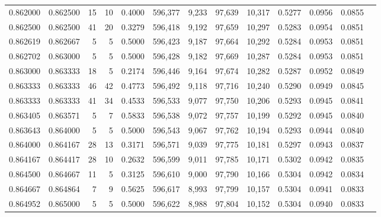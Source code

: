\begin{tabular}{rrrrrrrrrrrrr}
0.862000 & 0.862500 &    15 &  10 &                                     0.4000 & 596,377 &   9,233 &  97,639 &  10,317 & 0.5277 & 0.0956 & 0.0855 \\
0.862500 & 0.862500 &    41 &  20 &                                     0.3279 & 596,418 &   9,192 &  97,659 &  10,297 & 0.5283 & 0.0954 & 0.0851 \\
0.862619 & 0.862667 &     5 &   5 &                                     0.5000 & 596,423 &   9,187 &  97,664 &  10,292 & 0.5284 & 0.0953 & 0.0851 \\
0.862702 & 0.863000 &     5 &   5 &                                     0.5000 & 596,428 &   9,182 &  97,669 &  10,287 & 0.5284 & 0.0953 & 0.0851 \\
0.863000 & 0.863333 &    18 &   5 &                                     0.2174 & 596,446 &   9,164 &  97,674 &  10,282 & 0.5287 & 0.0952 & 0.0849 \\
0.863333 & 0.863333 &    46 &  42 &                                     0.4773 & 596,492 &   9,118 &  97,716 &  10,240 & 0.5290 & 0.0949 & 0.0845 \\
0.863333 & 0.863333 &    41 &  34 &                                     0.4533 & 596,533 &   9,077 &  97,750 &  10,206 & 0.5293 & 0.0945 & 0.0841 \\
0.863405 & 0.863571 &     5 &   7 &                                     0.5833 & 596,538 &   9,072 &  97,757 &  10,199 & 0.5292 & 0.0945 & 0.0840 \\
0.863643 & 0.864000 &     5 &   5 &                                     0.5000 & 596,543 &   9,067 &  97,762 &  10,194 & 0.5293 & 0.0944 & 0.0840 \\
0.864000 & 0.864167 &    28 &  13 &                                     0.3171 & 596,571 &   9,039 &  97,775 &  10,181 & 0.5297 & 0.0943 & 0.0837 \\
0.864167 & 0.864417 &    28 &  10 &                                     0.2632 & 596,599 &   9,011 &  97,785 &  10,171 & 0.5302 & 0.0942 & 0.0835 \\
0.864500 & 0.864667 &    11 &   5 &                                     0.3125 & 596,610 &   9,000 &  97,790 &  10,166 & 0.5304 & 0.0942 & 0.0834 \\
0.864667 & 0.864864 &     7 &   9 &                                     0.5625 & 596,617 &   8,993 &  97,799 &  10,157 & 0.5304 & 0.0941 & 0.0833 \\
0.864952 & 0.865000 &     5 &   5 &                                     0.5000 & 596,622 &   8,988 &  97,804 &  10,152 & 0.5304 & 0.0940 & 0.0833 \\

\end{tabular}
